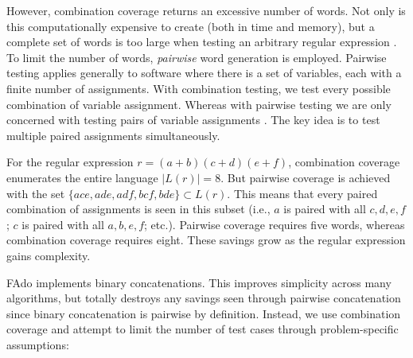 However, combination coverage returns an excessive number of words. Not only is this computationally expensive to create (both in time and memory), but a complete set of words is too large when testing an arbitrary regular expression \cite{pairgen}. To limit the number of words, \emph{pairwise} word generation is employed. Pairwise testing applies generally to software where there is a set of variables, each with a finite number of assignments. With combination testing, we test every possible combination of variable assignment. Whereas with pairwise testing we are only concerned with testing pairs of variable assignments \cite{pairwise}. The key idea is to test multiple paired assignments simultaneously.

For the regular expression $r = (a+b)(c+d)(e+f)$, combination coverage enumerates the entire language $|L(r)|=8$. But pairwise coverage is achieved with the set $\{ace, ade, adf, bcf, bde\} \subset L(r)$. This means that every paired combination of assignments is seen in this subset (i.e., $a$ is paired with all $c, d, e, f$; $c$ is paired with all $a,b,e,f$; etc.). Pairwise coverage requires five words, whereas combination coverage requires eight. These savings grow as the regular expression gains complexity.

FAdo implements binary concatenations. This improves simplicity across many algorithms, but totally destroys any savings seen through pairwise concatenation since binary concatenation is pairwise by definition. Instead, we use combination coverage and attempt to limit the number of test cases through problem-specific assumptions:

